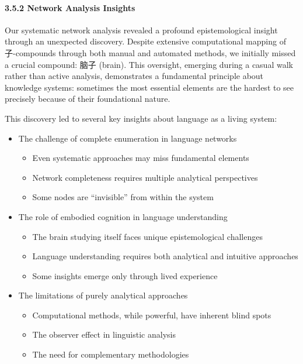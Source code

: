 \documentclass[
  11pt,
  letterpaper,
]{article}
\providecommand{\tightlist}{%
  \setlength{\itemsep}{0pt}\setlength{\parskip}{0pt}}
\begin{document}
\hypertarget{network-analysis-insights}{%
\paragraph{3.5.2 Network Analysis
Insights}\label{network-analysis-insights}}

Our systematic network analysis revealed a profound epistemological
insight through an unexpected discovery. Despite extensive computational
mapping of 子-compounds through both manual and automated methods, we
initially missed a crucial compound: 脑子 (brain). This oversight,
emerging during a casual walk rather than active analysis, demonstrates
a fundamental principle about knowledge systems: sometimes the most
essential elements are the hardest to see precisely because of their
foundational nature.

This discovery led to several key insights about language as a living
system:

\begin{itemize}
\tightlist
\item
  The challenge of complete enumeration in language networks

  \begin{itemize}
  \tightlist
  \item
    Even systematic approaches may miss fundamental elements
  \item
    Network completeness requires multiple analytical perspectives
  \item
    Some nodes are ``invisible'' from within the system
  \end{itemize}
\item
  The role of embodied cognition in language understanding

  \begin{itemize}
  \tightlist
  \item
    The brain studying itself faces unique epistemological challenges
  \item
    Language understanding requires both analytical and intuitive
    approaches
  \item
    Some insights emerge only through lived experience
  \end{itemize}
\item
  The limitations of purely analytical approaches

  \begin{itemize}
  \tightlist
  \item
    Computational methods, while powerful, have inherent blind spots
  \item
    The observer effect in linguistic analysis
  \item
    The need for complementary methodologies
  \end{itemize}
\end{itemize}
\end{document}
